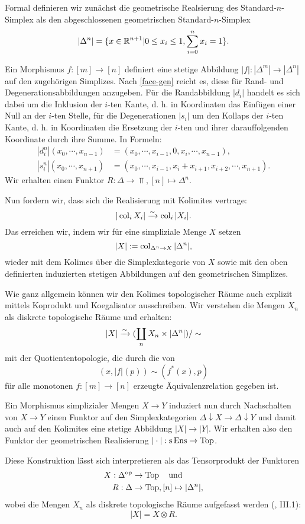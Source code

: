 Formal definieren wir zunächst die geometrische Realsierung des
Standard-$n$-Simplex als den abgeschlossenen geometrischen
Standard-$n$-Simplex
\[ |\Delta^n| = \{ x \in \mathbb{R}^{n+1} | 0 \leq x_i \leq 1, \sum_{i=0}^n x_i = 1 \}. \]

Ein Morphismus $f: [m] \to [n]$ definiert eine stetige Abbildung $|f|:
|\Delta^m| \to |\Delta^n|$ auf den zugehörigen
Simplizes. Nach \ref{face-gen} reicht es, diese für Rand- und
Degenerationsabbildungen anzugeben. Für die Randabbildung $|d_i|$
handelt es sich dabei um die Inklusion der $i$-ten Kante, d. h. in
Koordinaten das Einfügen einer Null an der $i$-ten Stelle, für die
Degenerationen $|s_i|$ um den Kollaps der $i$-ten Kante, d. h. in
Koordinaten die Ersetzung der $i$-ten und ihrer darauffolgenden
Koordinate durch ihre Summe. In Formeln:
\begin{align*}
  |d_i^n|(x_0, \cdots, x_{n-1})
  &= (x_0, \cdots, x_{i-1}, 0, x_i, \cdots, x_{n-1}), \\
  |s_i^n|(x_0, \cdots, x_{n+1})
  &= (x_0, \cdots, x_{i-1}, x_i + x_{i+1}, x_{i+2}, \cdots, x_{n+1}).
\end{align*}
Wir erhalten einen Funktor $R: \Delta \to \Top, [n] \mapsto \Delta^n$.

Nun fordern wir, dass sich die Realisierung mit Kolimites vertrage:
\[ |\operatorname{col}_i X_i| \xrightarrow{\sim} \operatorname{col}_i |X_i|. \]
Das erreichen wir, indem wir für eine simpliziale Menge $X$ setzen
\[ |X| := \operatorname{col}_{\Delta^n \to X} |\Delta^n|, \]
wieder mit dem Kolimes über die Simplexkategorie von $X$ sowie mit den
oben definierten induzierten stetigen Abbildungen auf den
geometrischen Simplizes.

Wie ganz allgemein können wir den Kolimes topologischer Räume auch
explizit mittels Koprodukt und Koegalisator ausschreiben. Wir
verstehen die Mengen $X_n$ als diskrete topologische Räume und
erhalten:
\[ |X| \xrightarrow{\sim} (\coprod_n X_n \times |\Delta^n|) / \sim \]
mit der Quotiententopologie, die durch die von
\[ (x, |f|(p)) \sim (f^*(x), p) \]
für alle monotonen $f: [m] \to [n]$ erzeugte Äquivalenzrelation
gegeben ist.

Ein Morphismus simplizialer Mengen $X \to Y$ induziert nun durch
Nachschalten von $X \to Y$ einen Funktor auf den Simplexkategorien
$\Delta \downarrow X \to \Delta \downarrow Y$ und damit auch auf den
Kolimites eine stetige Abbildung $|X| \to |Y|$. Wir erhalten also den
Funktor der geometrischen Realisierung $| \cdot |: \operatorname{s} \operatorname{Ens} \to \operatorname{Top}$.

\begin{bem}
Diese Konstruktion lässt sich interpretieren als das Tensorprodukt der
Funktoren
\begin{align*}
  X: \Delta^\mathrm{op} &\to \operatorname{Top} \quad \text{und} \\
  R: \Delta &\to \operatorname{Top}, [n] \mapsto |\Delta^n|,
\end{align*}
wobei die Mengen $X_n$ als diskrete topologische Räume aufgefasst
werden (\cite{Moer}, III.1):
\[ |X| = X \otimes R. \]
\end{bem}

